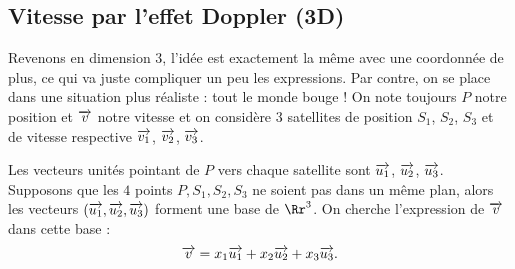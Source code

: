 \documentclass[class=report,crop=false]{standalone}
\begin{document}
\subsection{Vitesse par l'effet Doppler (3D)}

Revenons en dimension $3$, l'idée est exactement la même avec une coordonnée de plus, ce qui va juste compliquer
un peu les expressions. Par contre, on se place dans une situation plus réaliste : tout le monde bouge !
On note toujours $P$ notre position et $\overrightarrow v$ notre vitesse 
et on considère $3$ satellites de position $S_1$, $S_2$, $S_3$ et de vitesse respective 
$\overrightarrow{v_1}$, $\overrightarrow{v_2}$, $\overrightarrow{v_3}$.


Les vecteurs unités pointant de $P$ vers chaque satellite sont 
$\overrightarrow {u_1}$, $\overrightarrow {u_2}$, $\overrightarrow {u_3}$.
Supposons que les $4$ points $P, S_1, S_2, S_3$ ne soient pas dans un même plan, 
alors les vecteurs $(\overrightarrow {u_1}, \overrightarrow {u_2}, \overrightarrow {u_3})$ forment une base de $\Rr^3$. 
On cherche l'expression de $\overrightarrow v$ dans cette base :
$$\overrightarrow v = x_1 \overrightarrow{u_1}+x_2 \overrightarrow{u_2}+x_3 \overrightarrow{u_3}.$$
\end{document}
